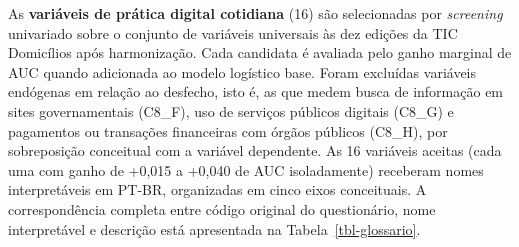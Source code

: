 \documentclass[
  man,
  floatsintext,
  longtable,
  a4paper,
  nolmodern,
  notxfonts,
  notimes,
  colorlinks=true,linkcolor=blue,citecolor=blue,urlcolor=blue]{apa7}
\begin{document}
As \textbf{variáveis de prática digital cotidiana} (16) são selecionadas
por \emph{screening} univariado sobre o conjunto de variáveis universais
às dez edições da TIC Domicílios após harmonização. Cada candidata é
avaliada pelo ganho marginal de AUC quando adicionada ao modelo
logístico base. Foram excluídas variáveis endógenas em relação ao
desfecho, isto é, as que medem busca de informação em sites
governamentais (C8\_F), uso de serviços públicos digitais (C8\_G) e
pagamentos ou transações financeiras com órgãos públicos (C8\_H), por
sobreposição conceitual com a variável dependente. As 16 variáveis
aceitas (cada uma com ganho de +0,015 a +0,040 de AUC isoladamente)
receberam nomes interpretáveis em PT-BR, organizadas em cinco eixos
conceituais. A correspondência completa entre código original do
questionário, nome interpretável e descrição está apresentada na
Tabela~\ref{tbl-glossario}.
\end{document}
